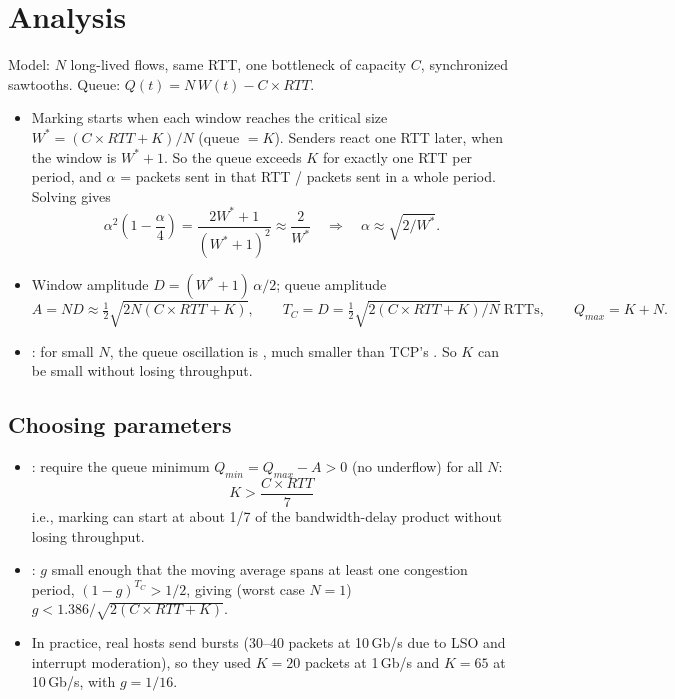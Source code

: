 \section{Analysis}
Model: $N$ long-lived flows, same RTT, one bottleneck of capacity $C$, synchronized sawtooths. Queue: $Q(t) = N\,W(t) - C\times RTT$.
\begin{itemize}
\item Marking starts when each window reaches the critical size $W^* = (C\times RTT + K)/N$ (queue $=K$). Senders react one RTT later, when the window is $W^*+1$. So the queue exceeds $K$ for exactly one RTT per period, and $\alpha$ = packets sent in that RTT / packets sent in a whole period. Solving gives
\[ \alpha^2\left(1-\frac{\alpha}{4}\right) = \frac{2W^*+1}{(W^*+1)^2} \approx \frac{2}{W^*} \quad\Rightarrow\quad \alpha \approx \sqrt{2/W^*}. \]
\item Window amplitude $D = (W^*+1)\,\alpha/2$; queue amplitude
\[ A = N D \approx \tfrac{1}{2}\sqrt{2N(C\times RTT + K)}, \qquad T_C = D = \tfrac{1}{2}\sqrt{2(C\times RTT+K)/N}\ \text{RTTs}, \qquad Q_{max} = K + N. \]
\item {}: for small $N$, the queue oscillation is , much smaller than TCP's . So $K$ can be small without losing throughput.
\end{itemize}

\subsection{Choosing parameters}
\begin{itemize}
\item {}: require the queue minimum $Q_{min} = Q_{max} - A > 0$ (no underflow) for all $N$:
\[ K > \frac{C\times RTT}{7} \]
i.e., marking can start at about 1/7 of the bandwidth-delay product without losing throughput.
\item {}: $g$ small enough that the moving average spans at least one congestion period, $(1-g)^{T_C} > 1/2$, giving (worst case $N=1$) $g < 1.386/\sqrt{2(C\times RTT+K)}$.
\item In practice, real hosts send bursts (30--40 packets at 10\,Gb/s due to LSO and interrupt moderation), so they used $K=20$ packets at 1\,Gb/s and $K=65$ at 10\,Gb/s, with $g=1/16$.
\end{itemize}

